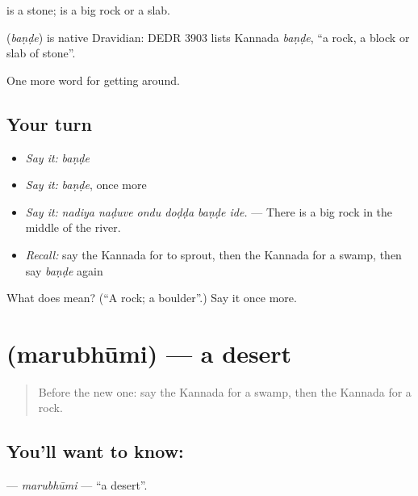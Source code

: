  is a stone;  is a big rock or a slab.

\begin{cousinweb}
\textbf{} (\emph{baṇḍe}) is native Dravidian: DEDR 3903 lists Kannada \emph{baṇḍe}, \textquotedblleft{}a rock, a block or slab of stone\textquotedblright{}.
\end{cousinweb}

\begin{grammarlens}[title={What you've built}]
One more word for getting around.
\end{grammarlens}

\subsection*{Your turn}
\begin{itemize}
\raggedright
  \item \emph{Say it:} \emph{baṇḍe}
  \item \emph{Say it:} \emph{baṇḍe}, once more
  \item \emph{Say it:} \emph{nadiya naḍuve ondu doḍḍa baṇḍe ide.} — There is a big rock in the middle of the river.
  \item \emph{Recall:} say the Kannada for to sprout, then the Kannada for a swamp, then say \emph{baṇḍe} again
\end{itemize}

\begin{tcolorbox}[breakable,colback=teal!4,colframe=teal!35!black,title={Before you move on}]
What does  mean? (\textquotedblleft{}A rock; a boulder\textquotedblright{}.) Say it once more.
\end{tcolorbox}
\section[\texorpdfstring{\kn{ಮರುಭೂಮಿ} (marubhūmi)}{ಮರುಭೂಮಿ (marubhūmi)}]{ (marubhūmi) — a desert}

\label{lesson:KA-C480-marubhumi}



\begin{quote}
Before the new one: say the Kannada for a swamp, then the Kannada for a rock.
\end{quote}

\subsection*{You'll want to know: }
\textbf{} — \emph{marubhūmi} — \textquotedblleft{}a desert\textquotedblright{}.

